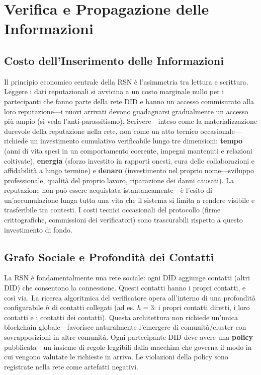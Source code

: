 \documentclass[11pt,a4paper,twocolumn]{article}
\begin{document}
\section{Verifica e Propagazione delle Informazioni}

\subsection{Costo dell'Inserimento delle Informazioni}

Il principio economico centrale della RSN è l'asimmetria tra lettura e scrittura. Leggere i dati reputazionali si avvicina a un costo marginale nullo per i partecipanti che fanno parte della rete DID e hanno un accesso commisurato alla loro reputazione---i nuovi arrivati devono guadagnarsi gradualmente un accesso più ampio (si veda l'anti-parassitismo). Scrivere---inteso come la materializzazione durevole della reputazione nella rete, non come un atto tecnico occasionale---richiede un investimento cumulativo verificabile lungo tre dimensioni: \textbf{tempo} (anni di vita spesi in un comportamento coerente, impegni mantenuti e relazioni coltivate), \textbf{energia} (sforzo investito in rapporti onesti, cura delle collaborazioni e affidabilità a lungo termine) e \textbf{denaro} (investimento nel proprio nome---sviluppo professionale, qualità del proprio lavoro, riparazione dei danni causati). La reputazione non può essere acquistata istantaneamente---è l'esito di un'accumulazione lunga tutta una vita che il sistema si limita a rendere visibile e trasferibile tra contesti. I costi tecnici occasionali del protocollo (firme crittografiche, commissioni dei verificatori) sono trascurabili rispetto a questo investimento di fondo.

\subsection{Grafo Sociale e Profondità dei Contatti}

La RSN è fondamentalmente una rete sociale: ogni DID aggiunge contatti (altri DID) che consentono la connessione. Questi contatti hanno i propri contatti, e così via. La ricerca algoritmica del verificatore opera all'interno di una profondità configurabile $h$ di contatti collegati (ad es. $h=3$: i propri contatti diretti, i loro contatti e i contatti dei contatti). Questa architettura non richiede un'unica blockchain globale---favorisce naturalmente l'emergere di comunità/cluster con sovrapposizioni in altre comunità. Ogni partecipante DID deve avere una \textbf{policy} pubblicata---un insieme di regole leggibili dalla macchina che governa il modo in cui vengono valutate le richieste in arrivo. Le violazioni della policy sono registrate nella rete come artefatti negativi.
\end{document}
